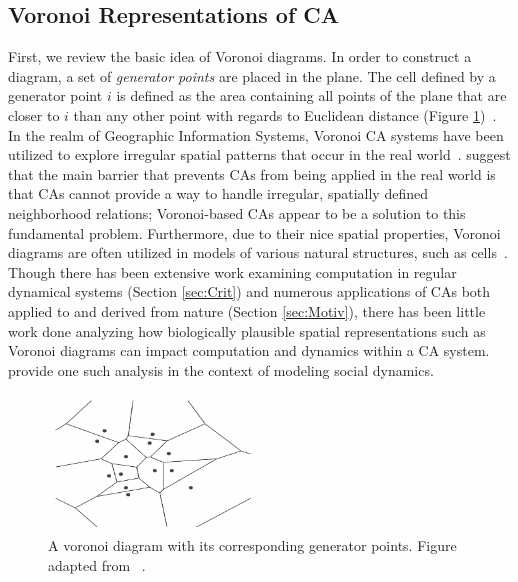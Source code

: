 \documentclass[a4paper,11pt,twoside]{report}
\begin{document}

\subsection{Voronoi Representations of CA}
\label{subsec:ModelVoronoiRep}
First, we review the basic idea of Voronoi diagrams. In order to construct a diagram, a set of \textit{generator points} are placed in the plane. The cell defined by a generator point $i$ is defined as the area containing all points of the plane that are closer to $i$ than any other point with regards to Euclidean distance (Figure \ref{fig:voronoi})~\cite{ok09}. In the realm of Geographic Information Systems, Voronoi CA systems have been utilized to explore irregular spatial patterns that occur in the real world~\cite{ca06,sh00}. \citeauthor{sh00} suggest that the main barrier that prevents CAs from being applied in the real world is that CAs cannot provide a way to handle irregular, spatially defined neighborhood relations; Voronoi-based CAs appear to be a solution to this fundamental problem. Furthermore, due to their nice spatial properties, Voronoi diagrams are often utilized in models of various natural structures, such as cells~\cite{ok09}. Though there has been extensive work examining computation in regular dynamical systems (Section \ref{sec:Crit}) and numerous applications of CAs both applied to and derived from nature (Section \ref{sec:Motiv}), there has been little work done analyzing how biologically plausible spatial representations such as Voronoi diagrams can impact computation and dynamics within a CA system. \citeauthor{fl01} provide one such analysis in the context of modeling social dynamics.

\begin{figure}[htp]
\centering
\includegraphics[width=0.5\textwidth]{wh03_fig1_voronoi}
\caption[Voronoi Diagram]{
	A voronoi diagram with its corresponding generator points. Figure adapted from \citeauthor{wh03}~\cite{wh03}.
}
\label{fig:voronoi}
\end{figure}
\end{document}
